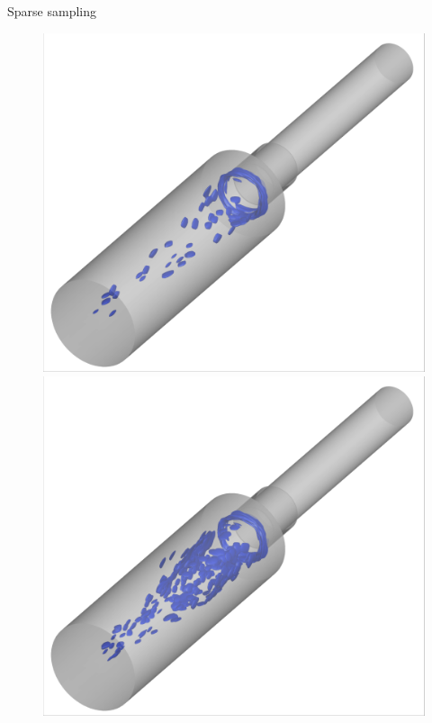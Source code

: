 \documentclass[]{beamer}
\begin{document}
\begin{frame}{Sparse sampling}
\begin{figure}
		\centering
		\begin{minipage}{0.3\linewidth}
			\includegraphics[width=0.99\linewidth,trim={0.5em 0.5em 0.5em 0.5em},clip]{Images/experiments/cvrc/iblank/greedy_carlberg_iblank_iso.png}
		\end{minipage}
		\begin{minipage}{0.3\linewidth}
			\includegraphics[width=0.99\linewidth,trim={0.5em 0.5em 0.5em 0.5em},clip]{Images/experiments/cvrc/iblank/greedy_ben_iblank_iso.png}
		\end{minipage}
	\end{figure}
\end{frame}
\end{document}
